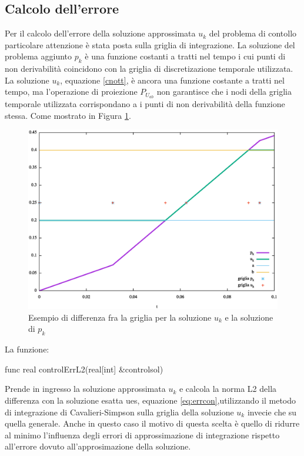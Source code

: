 \subsection{Calcolo dell'errore}
Per il calcolo dell'errore della soluzione approssimata $u_k$ del problema di contollo particolare attenzione è stata posta sulla griglia di integrazione. La soluzione del problema aggiunto $p_k$ è una funzione costanti a tratti nel tempo i cui punti di non derivabilità coincidono con la griglia di discretizazione temporale utilizzata. La soluzione $u_k$, equazione \eqref{cnott}, è ancora una funzione costante a tratti nel tempo, ma l'operazione di proiezione $P_{U_{ab}}$ non garantisce che i nodi della griglia temporale utilizzata corrispondano a i punti di non derivabilità della funzione stessa. Come mostrato in Figura \ref{fig:griglie}.
\begin{figure}
\centering
\includegraphics[width=\linewidth]{img/cap5/griglie}
\caption{Esempio di differenza fra la griglia per la soluzione $u_k$ e la soluzione di $p_k$}
\label{fig:griglie}
\end{figure}
La funzione:
\begin{Code}[caption={Funzione \texttt{controlErrL2}}]
func real controlErrL2(real[int] &controlsol)
\end{Code}
Prende in ingresso la soluzione approssimata $u_k$ e calcola la norma L2 della differenza con la soluzione esatta ues, equazione \eqref{eq:errcon},utilizzando il metodo di integrazione di Cavalieri-Simpson sulla griglia della soluzione $u_k$ invecie che su quella generale. Anche in questo caso il motivo di questa scelta è quello di ridurre al minimo l'influenza degli errori di approssimazione di integrazione rispetto all'errore dovuto all'approsimazione della soluzione.
